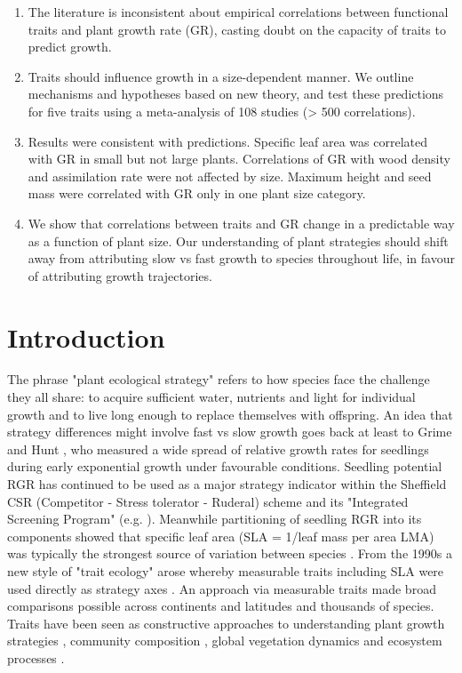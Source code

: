 \documentclass[a4paper]{article}\usepackage[]{graphicx}\usepackage[]{color}
\begin{document}
\begin{enumerate}

\item
The literature is inconsistent about empirical correlations between functional traits and plant growth rate (GR), casting doubt on the capacity of traits to predict growth.

\item 
Traits should influence growth in a size-dependent manner. We outline mechanisms and hypotheses based on new theory, and test these predictions for five traits using a meta-analysis of 108 studies (\textgreater{} 500 correlations).

\item
Results were consistent with predictions. Specific leaf area was correlated with GR in small but not large plants. Correlations of GR with wood density and assimilation rate were not affected by size. Maximum height and seed mass were correlated with GR only in one plant size category.

\item 
We show that correlations between traits and GR change in a predictable way as a function of plant size. Our understanding of plant strategies should shift away from attributing slow vs fast growth to species throughout life, in favour of attributing growth trajectories.

 
\end{enumerate}


\section*{Introduction}\label{introduction}


The phrase "plant ecological strategy" refers to how species face the challenge they all share:  to acquire sufficient water, nutrients and light for individual growth and to live long enough to replace themselves with offspring. An idea that strategy differences might involve fast vs slow growth goes back at least to Grime and Hunt \citeyearpar{Grime:1975gr}, who measured a wide spread of relative growth rates for seedlings during early exponential growth under favourable conditions. Seedling potential RGR has continued to be used as a major strategy indicator within the Sheffield CSR (Competitor - Stress tolerator - Ruderal) scheme and its "Integrated Screening Program" (e.g. \citealt{grime1979plant, Grime:1997wm}). Meanwhile partitioning of seedling RGR into its components showed that specific leaf area (SLA = 1/leaf mass per area LMA) was typically the strongest source of variation between species \citep{Poorter:1989tx}. From the 1990s a new style of "trait ecology" arose whereby measurable traits including SLA were used directly as strategy axes \citep{Westoby:2002ft}. An approach via measurable traits made broad comparisons possible across continents and latitudes and thousands of species. Traits have been seen as constructive approaches to understanding plant growth strategies \citep{Grime:1977kc,Chapin:1980gz}, community composition \citep{Lavorel:2002ff,Shipley:2006ie}, global vegetation dynamics \citep{Scheiter:2013ed} and ecosystem processes \citep{Lavorel:2002ff}.
\end{document}
